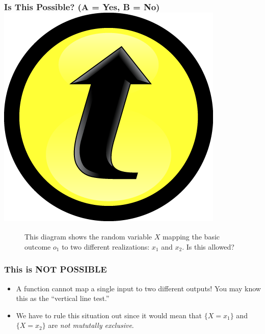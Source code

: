 \begin{frame}
\frametitle{Is This Possible? (A = Yes, B = No) \hfill \includegraphics[scale = 0.05]{./images/clicker}}

\begin{figure}
\caption{This diagram shows the random variable $X$ mapping the basic outcome $o_1$ to two different realizations: $x_1$ and $x_2$. Is this allowed?}
\end{figure}

\end{frame}


\begin{frame}
\frametitle{This is NOT POSSIBLE}

\begin{figure}
\centering
{}
\end{figure}

\begin{itemize}
	\item A function cannot map a single input to two different outputs! You may know this as the ``vertical line test.''
	\item We have to rule this situation out since it would mean that $\{X = x_1\}$ and $\{X = x_2\}$ are \emph{not mututally exclusive}.
\end{itemize}

\end{frame}


